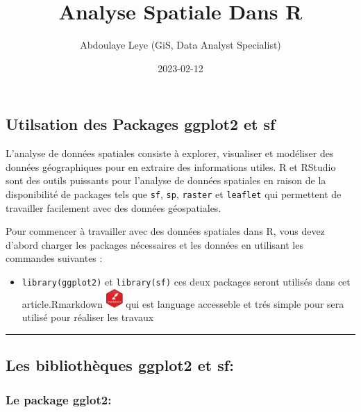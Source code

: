 \documentclass[
]{article}
\title{Analyse Spatiale Dans R}
\author{Abdoulaye Leye (GiS, Data Analyst Specialist)}
\date{2023-02-12}
\providecommand{\tightlist}{%
  \setlength{\itemsep}{0pt}\setlength{\parskip}{0pt}}
\begin{document}
\maketitle

\hypertarget{utilsation-des-packages-ggplot2-et-sf}{%
\subsection{Utilsation des Packages ggplot2 et
sf}\label{utilsation-des-packages-ggplot2-et-sf}}

L'analyse de données spatiales consiste à explorer, visualiser et
modéliser des données géographiques pour en extraire des informations
utiles. R et RStudio sont des outils puissants pour l'analyse de données
spatiales en raison de la disponibilité de packages tels que
\texttt{sf}, \texttt{sp}, \texttt{raster} et \texttt{leaflet} qui
permettent de travailler facilement avec des données géospatiales.

Pour commencer à travailler avec des données spatiales dans R, vous
devez d'abord charger les packages nécessaires et les données en
utilisant les commandes suivantes :

\begin{itemize}
\tightlist
\item
  \texttt{library(ggplot2)} et \texttt{library(sf)} ces deux packages
  seront utilisés dans cet article.Rmarkdown
  \includegraphics[width=0.05\textwidth,height=\textheight]{rmarkdown_logo.png}
  qui est language accesseble et trés simple pour sera utilisé pour
  réaliser les travaux
\end{itemize}

\begin{center}\rule{0.5\linewidth}{0.5pt}\end{center}

\hypertarget{les-bibliothuxe8ques-ggplot2-et-sf}{%
\subsection{\texorpdfstring{Les bibliothèques \textbf{ggplot2} et
\textbf{sf}:}{Les bibliothèques ggplot2 et sf:}}\label{les-bibliothuxe8ques-ggplot2-et-sf}}

\hypertarget{le-package-gglot2}{%
\subsubsection{\texorpdfstring{Le package
\textbf{gglot2}:}{Le package gglot2:}}\label{le-package-gglot2}}
\end{document}
